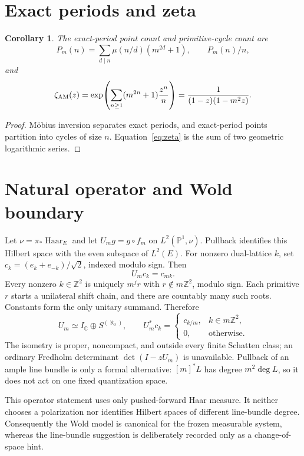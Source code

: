 \documentclass[10pt]{article}
\newtheorem{corollary}[theorem]{Corollary}
\newcommand{\Haar}{\operatorname{Haar}}
\begin{document}
\section{Exact periods and zeta}
\begin{corollary}\label{cor:zeta}
The exact-period point count and primitive-cycle count are
\[
 P_m(n)=\sum_{d\mid n}\mu(n/d)(m^{2d}+1),\qquad P_m(n)/n,
\]
and
\begin{equation}\label{eq:zeta}
 \zeta_{\rm AM}(z)=\exp\!\left(\sum_{n\ge1}(m^{2n}+1)\frac{z^n}{n}\right)
 =\frac1{(1-z)(1-m^2z)}.
\end{equation}
\end{corollary}
\begin{proof}
M\"obius inversion separates exact periods, and exact-period points partition
into cycles of size $n$.  Equation~\eqref{eq:zeta} is the sum of two geometric
logarithmic series.
\end{proof}

\section{Natural operator and Wold boundary}
Let $\nu=\pi_*\Haar_E$ and let $U_mg=g\circ f_m$ on
$L^2(\mathbb P^1,\nu)$.  Pullback identifies this Hilbert space with the even
subspace of $L^2(E)$.  For nonzero dual-lattice $k$, set
$c_k=(e_k+e_{-k})/\sqrt2$, indexed modulo sign.  Then
\[
 U_mc_k=c_{mk}.
\]
Every nonzero $k\in\mathbb Z^2$ is uniquely $m^jr$ with
$r\notin m\mathbb Z^2$, modulo sign.  Each primitive $r$ starts a unilateral
shift chain, and there are countably many such roots.  Constants form the
only unitary summand.  Therefore
\begin{equation}\label{eq:wold}
 U_m\simeq I_{\mathbb C}\oplus S^{(\aleph_0)},\qquad
 U_m^*c_k=\begin{cases}c_{k/m},&k\in m\mathbb Z^2,\\0,&\text{otherwise}.
 \end{cases}
\end{equation}
The isometry is proper, noncompact, and outside every finite Schatten class;
an ordinary Fredholm determinant $\det(I-zU_m)$ is unavailable.  Pullback of
an ample line bundle is only a formal alternative: $[m]^*L$ has degree
$m^2\deg L$, so it does not act on one fixed quantization space.

This operator statement uses only pushed-forward Haar measure.  It neither
chooses a polarization nor identifies Hilbert spaces of different line-bundle
degree.  Consequently the Wold model is canonical for the frozen measurable
system, whereas the line-bundle suggestion is deliberately recorded only as
a change-of-space hint.
\end{document}
